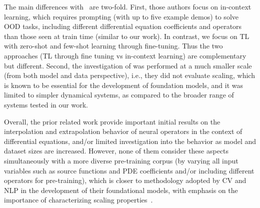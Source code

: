 The main differences with~\cite{yang2023context} are two-fold.
First, those authors focus on in-context learning, which requires prompting (with up to five example demos) to solve OOD tasks, including different differential equation coefficients and operators than those seen at train time (similar to our work). 
In contrast, we focus on TL with zero-shot and few-shot learning through fine-tuning. 
Thus the two approaches (TL through fine tuning vs in-context learning) are complementary but different. 
Second, the investigation of \cite{yang2023context} was performed at a much smaller scale (from both model and data perspective), i.e., they did not evaluate scaling, which is known to be essential for the development of foundation models, and it was limited to simpler dynamical systems, as compared to the broader range of systems tested in our work.

Overall, the prior related work provide important initial results on the interpolation and extrapolation behavior of neural operators in the context of differential equations, and/or limited investigation into the behavior as model and dataset sizes are increased.
However, none of them consider these aspects simultaneously with a more diverse pre-training corpus (by varying all input variables such as source functions and PDE coefficients and/or including different operators for pre-training), which is closer to methodology adopted by CV and NLP in the development of their foundational models, with emphasis on
the importance of characterizing scaling properties~\cite{kaplan2020scaling,hoffmann2022empirical}.
% 
